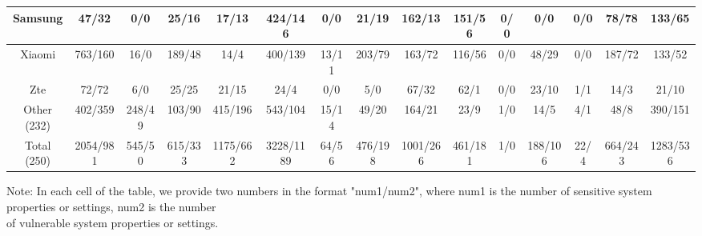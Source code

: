 \begin{table*}[t]
\begin{threeparttable}
{\begin{tabular}{|c|ccccccc|ccccccc|}
Samsung                & \multicolumn{1}{c|}{47/32}    & \multicolumn{1}{c|}{0/0}    & \multicolumn{1}{c|}{25/16}   & \multicolumn{1}{c|}{17/13}    & \multicolumn{1}{c|}{424/146}   & \multicolumn{1}{c|}{0/0}      & 21/19   & \multicolumn{1}{c|}{162/13}   & \multicolumn{1}{c|}{151/56}  & \multicolumn{1}{c|}{0/0}  & \multicolumn{1}{c|}{0/0}     & \multicolumn{1}{c|}{0/0}  & \multicolumn{1}{c|}{78/78}    & 133/65   \\ \hline
Xiaomi                 & \multicolumn{1}{c|}{763/160}  & \multicolumn{1}{c|}{16/0}   & \multicolumn{1}{c|}{189/48}  & \multicolumn{1}{c|}{14/4}     & \multicolumn{1}{c|}{400/139}   & \multicolumn{1}{c|}{13/11}    & 203/79  & \multicolumn{1}{c|}{163/72}   & \multicolumn{1}{c|}{116/56}  & \multicolumn{1}{c|}{0/0}  & \multicolumn{1}{c|}{48/29}   & \multicolumn{1}{c|}{0/0}  & \multicolumn{1}{c|}{187/72}   & 133/52   \\ \hline
Zte                    & \multicolumn{1}{c|}{72/72}    & \multicolumn{1}{c|}{6/0}    & \multicolumn{1}{c|}{25/25}   & \multicolumn{1}{c|}{21/15}    & \multicolumn{1}{c|}{24/4}      & \multicolumn{1}{c|}{0/0}      & 5/0     & \multicolumn{1}{c|}{67/32}    & \multicolumn{1}{c|}{62/1}    & \multicolumn{1}{c|}{0/0}  & \multicolumn{1}{c|}{23/10}   & \multicolumn{1}{c|}{1/1}  & \multicolumn{1}{c|}{14/3}     & 21/10    \\ \hline
Other (232)            & \multicolumn{1}{c|}{402/359}  & \multicolumn{1}{c|}{248/49} & \multicolumn{1}{c|}{103/90}  & \multicolumn{1}{c|}{415/196}  & \multicolumn{1}{c|}{543/104}   & \multicolumn{1}{c|}{15/14}    & 49/20   & \multicolumn{1}{c|}{164/21}   & \multicolumn{1}{c|}{23/9}    & \multicolumn{1}{c|}{1/0}  & \multicolumn{1}{c|}{14/5}    & \multicolumn{1}{c|}{4/1}  & \multicolumn{1}{c|}{48/8}     & 390/151  \\ \hline
Total (250)            & \multicolumn{1}{c|}{2054/981} & \multicolumn{1}{c|}{545/50} & \multicolumn{1}{c|}{615/333} & \multicolumn{1}{c|}{1175/662} & \multicolumn{1}{c|}{3228/1189} & \multicolumn{1}{c|}{64/56}    & 476/198 & \multicolumn{1}{c|}{1001/266} & \multicolumn{1}{c|}{461/181} & \multicolumn{1}{c|}{1/0}  & \multicolumn{1}{c|}{188/106} & \multicolumn{1}{c|}{22/4} & \multicolumn{1}{c|}{664/243}  & 1283/536 \\ \hline
\end{tabular}
}
\begin{tablenotes}
	\footnotesize
	\item Note: In each cell of the table, we provide two numbers in the format "num1/num2", where num1 is the number of sensitive system properties or settings, num2 is the number \\of vulnerable system properties or settings.
\end{tablenotes}
\end{threeparttable}
\end{table*}


